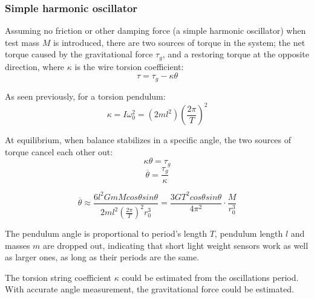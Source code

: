 \documentclass[\main/master.tex]{subfiles}
\begin{document}
\subsubsection{Simple harmonic oscillator}
Assuming no friction or other damping force (a simple harmonic oscillator) when test mass $M$ is introduced, there are two sources of torque in the system; the net torque caused by the gravitational force $\tau_g$, and a restoring torque at the opposite direction, where  $\kappa$ is the wire torsion coefficient:
\begin{equation}
\tau = \tau_g - \kappa\theta     \label{eqn:gravitation_torque}
\end{equation}
\par\noindent
As seen previously, for a torsion pendulum:
\begin{equation}
\kappa = I\omega_0^2 = (2ml^2)(\frac{2\pi}{T})^2     \label{eqn:moment_inertia}
\end{equation} 
\par\noindent
At equilibrium, when balance stabilizes in a specific angle, the two sources of torque cancel each other out:
\begin{equation}
\kappa\theta = \tau_g    \label{eqn:gravitation_torque}
\end{equation}
\begin{equation}
\overline{\theta} = \frac{\tau_g}{\kappa}     \label{eqn:theta average}
\end{equation} 

 

\begin{equation}
\overline{\theta} \approx \frac{6l^2GmMcos\theta sin\theta}{2ml^2 (\frac{2\pi}{T})^2 r_0^3} = \frac{3GT^2cos\theta sin\theta}{4\pi^2 } \cdot \frac{M}{r_0^3}   \label{eqn:theta average}
\end{equation}
\par\noindent
The pendulum angle is proportional to period's length $T$, pendulum length $l$ and masses $m$ are dropped out, indicating that short light weight sensors work as well as larger ones, as long as their periods are the same.
\par\noindent
The torsion string coefficient $\kappa$ could be estimated from the oscillations period. With accurate angle measurement, the gravitational force could be estimated.
 
\end{document}
